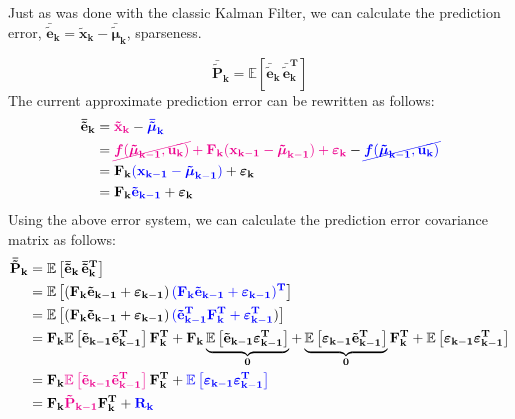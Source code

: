 \documentclass[12pt]{article}
\newcommand{\bvec}[1]{\mathbf{#1}} %
\newcommand{\bvecT}[1]{\mathbf{#1^T}} %
\newcommand{\mat}[1]{\mathbf{#1}}
\newcommand{\matT}[1]{\mathbf{#1^T}}
\newcommand{\brac}[1]{\left[#1\right]} %
\newcommand{\mb}[1]{{\boldsymbol{#1}}} %
\newcommand{\expv}[1]{\mathbb{E}\brac{#1}} %
\newcommand{\blue}[1]{\color{blue}#1\color{black}}
\newcommand{\magenta}[1]{\color{magenta}#1\color{black}}
\begin{document}
Just as was done with the classic Kalman Filter, we can calculate the prediction error, $\bvec{\bar{\tilde{e}}_k} = \bvec{\tilde{x}_k} - \mb{\bar{\tilde\mu}}_\mathbf{k}$, sparseness.

\begin{equation}
\mat{\bar{\tilde P}_k} = \expv{\bvec{\bar{\tilde{e}}_k}\, \bvecT{\bar{\tilde{e}}_k}}    
\end{equation}
The current approximate prediction error can be rewritten as follows:
\begin{equation}
    \begin{aligned}
        \bvec{\bar{\tilde{e}}_k} &= \magenta{\bvec{\tilde{x}_k}} - \blue{\mb{\bar{\tilde\mu}}_\mathbf{k}}\\
        &= \magenta{\cancel{\mb{f}(\mb{\tilde\mu}_\mathbf{k-1}, \bvec{u_k})} + \mat{F_k} (\bvec{x_{k-1}} - \mb{\tilde\mu}_\mathbf{k-1}) + \mb{\varepsilon}_\mathbf{k}} - \blue{\cancel{\mb{f}(\mb{\tilde\mu}_\mathbf{k-1}, \bvec{u_k})}}\\
        &= \mat{F_k} \blue{(\bvec{x_{k-1}} - \mb{\tilde\mu}_\mathbf{k-1})} + \mb{\varepsilon}_\mathbf{k}\\
        &= \mat{F_k}\blue{\bvec{\tilde{e}_{k-1}}} + \mb{\varepsilon}_\mathbf{k}
    \end{aligned}
\end{equation}
Using the above error system, we can calculate the prediction error covariance matrix as follows:
\begin{equation}
    \begin{aligned}
        \mat{\bar{\tilde P}_k} &= \expv{\bvec{\bar{\tilde{e}}_k}\, \bvecT{\bar{\tilde{e}}_k}}\\
        &= \expv{(\mat{F_k}\bvec{\tilde{e}_{k-1}} + \mb{\varepsilon}_\mathbf{k-1}) \, \blue{(\mat{F_k}\bvec{\tilde{e}_{k-1}} + \mb{\varepsilon}_\mathbf{k-1})^\mathbf{T}}}\\
        &= \expv{(\mat{F_k}\bvec{\tilde{e}_{k-1}} + \mb{\varepsilon}_\mathbf{k-1}) \, \blue{(\bvecT{\tilde{e}_{k-1}}\matT{F_k} + \mb{\varepsilon}_\mathbf{k-1}^\mathbf{T}})}\\
        &= \mat{F_k}\expv{\bvec{\tilde{e}_{k-1}} \bvecT{\tilde{e}_{k-1}}}\matT{F_k} + \mat{F_k} \underbrace{\expv{ \bvec{\tilde{e}_{k-1}} \mb{\varepsilon}_\mathbf{k-1}^\mathbf{T} }}_{\mat{0}} + \underbrace{\expv{\mb{\varepsilon}_\mathbf{k-1} \bvecT{\tilde{e}_{k-1}}}}_{\mat{0}} \matT{F_{k}} + \expv{\mb{\varepsilon}_\mathbf{k-1} \mb{\varepsilon}_\mathbf{k-1}^\mathbf{T}}\\
        &= \mat{F_k}\magenta{\expv{\bvec{\tilde{e}_{k-1}} \bvecT{\tilde{e}_{k-1}}}}\matT{F_k} + \blue{\expv{\mb{\varepsilon}_\mathbf{k-1} \mb{\varepsilon}_\mathbf{k-1}^\mathbf{T}}}\\
        &= \mat{F_k}\magenta{ \mat{\tilde{P}_{k-1}} } \matT{F_k} + \blue{\mat{R_k}}
    \end{aligned}
\end{equation}
\end{document}
